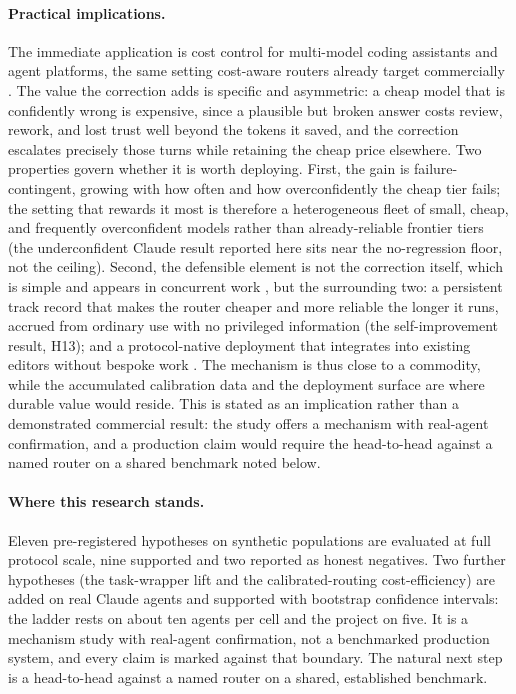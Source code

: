 \documentclass[11pt]{article}
\begin{document}
\paragraph{Practical implications.} The immediate application is cost control for multi-model coding assistants and agent platforms, the same setting cost-aware routers already target commercially \citep{chen2023frugalgpt,ong2024routellm,ding2025bestroute}. The value the correction adds is specific and asymmetric: a cheap model that is confidently wrong is expensive, since a plausible but broken answer costs review, rework, and lost trust well beyond the tokens it saved, and the correction escalates precisely those turns while retaining the cheap price elsewhere. Two properties govern whether it is worth deploying. First, the gain is failure-contingent, growing with how often and how overconfidently the cheap tier fails; the setting that rewards it most is therefore a heterogeneous fleet of small, cheap, and frequently overconfident models rather than already-reliable frontier tiers (the underconfident Claude result reported here sits near the no-regression floor, not the ceiling). Second, the defensible element is not the correction itself, which is simple and appears in concurrent work \citep{armstrong2026margin,kotte2026ucci}, but the surrounding two: a persistent track record that makes the router cheaper and more reliable the longer it runs, accrued from ordinary use with no privileged information (the self-improvement result, H13); and a protocol-native deployment that integrates into existing editors without bespoke work \citep{acp2025}. The mechanism is thus close to a commodity, while the accumulated calibration data and the deployment surface are where durable value would reside. This is stated as an implication rather than a demonstrated commercial result: the study offers a mechanism with real-agent confirmation, and a production claim would require the head-to-head against a named router on a shared benchmark noted below.

\paragraph{Where this research stands.} Eleven pre-registered hypotheses on synthetic populations are evaluated at full protocol scale, nine supported and two reported as honest negatives. Two further hypotheses (the task-wrapper lift and the calibrated-routing cost-efficiency) are added on real Claude agents and supported with bootstrap confidence intervals: the ladder rests on about ten agents per cell and the project on five. It is a mechanism study with real-agent confirmation, not a benchmarked production system, and every claim is marked against that boundary. The natural next step is a head-to-head against a named router on a shared, established benchmark.
\end{document}
